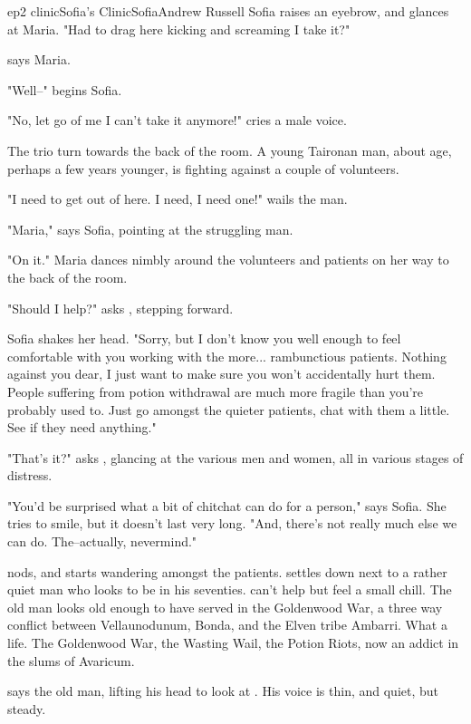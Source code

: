 \documentclass{book}
\begin{document}
\begin{node}{ep2 clinic}{Sofia's Clinic}{Sofia}{Andrew Russell}
    Sofia raises an eyebrow, and glances at Maria. "Had to drag \himher{} here kicking and screaming I take it?"

     says Maria.

    "Well--" begins Sofia.

    "No, let go of me I can't take it anymore!" cries a male voice.

    The trio turn towards the back of the room. A young Taironan man, about \names{} age, perhaps a few years younger, is fighting against a couple of volunteers.

    "I need to get out of here. I need, I need one!" wails the man.

    "Maria," says Sofia, pointing at the struggling man.

    "On it." Maria dances nimbly around the volunteers and patients on her way to the back of the room.

    "Should I help?" asks \name{}, stepping forward.

    Sofia shakes her head. "Sorry, but I don't know you well enough to feel comfortable with you working with the more... rambunctious patients. Nothing against you dear, I just want to make sure you won't accidentally hurt them. People suffering from potion
    withdrawal are much more fragile than you're probably used to. Just go amongst the quieter patients, chat with them a little. See if they need anything."

    "That's it?" asks \name{}, glancing at the various men and women, all in various stages of distress.

    "You'd be surprised what a bit of chitchat can do for a person," says Sofia. She tries to smile, but it doesn't last very long. "And, there's not really much else we can do. The--actually, nevermind."

    \name{} nods, and starts wandering amongst the patients. \HeShe{} settles down next to a rather quiet man who looks to be in his seventies. \name{} can't help but feel a small chill. The old man 
    looks old enough to
    have served in the Goldenwood War, a three way conflict between Vellaunodunum, Bonda, and the Elven tribe Ambarri. What a life. The Goldenwood War, the Wasting Wail, the Potion Riots, now an 
    addict in the slums of Avaricum.
    
     says the old man, lifting his head to look at \name{}. His voice is thin, and quiet, but steady.


\end{node}
\end{document}
